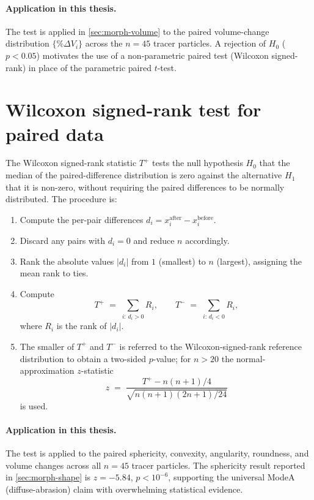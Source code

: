 \paragraph{Application in this thesis.} The test is applied in
\cref{sec:morph-volume} to the paired volume-change distribution
$\{\%\Delta V_i\}$ across the $n=45$ tracer particles. A rejection of
$H_0$ ($p < 0.05$) motivates the use of a non-parametric paired test
(Wilcoxon signed-rank) in place of the parametric paired $t$-test.

\section{Wilcoxon signed-rank test for paired data}
\label{sec:appC-wilcoxon}

The Wilcoxon signed-rank statistic $T^+$ tests the null hypothesis
$H_0$ that the median of the paired-difference distribution is zero
against the alternative $H_1$ that it is non-zero, without requiring
the paired differences to be normally distributed. The procedure is:
\begin{enumerate}[leftmargin=*]
    \item Compute the per-pair differences
          $d_i = x_i^{\mathrm{after}} - x_i^{\mathrm{before}}$.
    \item Discard any pairs with $d_i = 0$ and reduce $n$ accordingly.
    \item Rank the absolute values $|d_i|$ from $1$ (smallest) to $n$
          (largest), assigning the mean rank to ties.
    \item Compute
          \begin{equation}
              T^+ \;=\; \sum_{i:\,d_i>0} R_i,
              \qquad
              T^- \;=\; \sum_{i:\,d_i<0} R_i,
              \label{eq:appC-wilcoxon}
          \end{equation}
          where $R_i$ is the rank of $|d_i|$.
    \item The smaller of $T^+$ and $T^-$ is referred to the
          Wilcoxon-signed-rank reference distribution to obtain a
          two-sided $p$-value; for $n>20$ the normal-approximation
          $z$-statistic
          \begin{equation}
              z \;=\; \frac{T^+ - n(n+1)/4}{\sqrt{n(n+1)(2n+1)/24}}
              \label{eq:appC-wilcoxon-z}
          \end{equation}
          is used.
\end{enumerate}

\paragraph{Application in this thesis.} The test is applied to the
paired sphericity, convexity, angularity, roundness, and volume changes
across all $n=45$ tracer particles. The sphericity result reported in
\cref{sec:morph-shape} is $z = -5.84$, $p < 10^{-6}$, supporting the
universal \gls{ModeA} (diffuse-abrasion) claim with overwhelming
statistical evidence.

